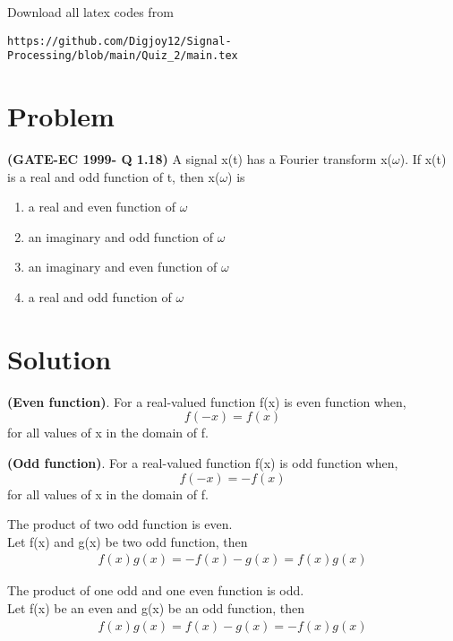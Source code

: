\documentclass[journal,12pt,twocolumn]{IEEEtran}
\begin{document}
%
Download all latex codes from 
%
\begin{lstlisting}
https://github.com/Digjoy12/Signal-Processing/blob/main/Quiz_2/main.tex
\end{lstlisting}
\section*{\textbf{Problem}}
\textbf{(GATE-EC 1999- Q 1.18)} A signal x(t) has a Fourier transform x($\omega$). If x(t) is a real and odd function of t, then x($\omega$) is
\begin{enumerate}[label=(\alph*)]
    \item a real and even function of $\omega$
    \item an imaginary and odd function of $\omega$
    \item an imaginary and even function of $\omega$
    \item a real and odd function of $\omega$
\end{enumerate}
\section*{\textbf{Solution}}
\begin{definition}{\textbf{(Even function)}}.
 For a real-valued function f(x) is even function when,
 \begin{equation}
     f(-x) = f(x)
 \end{equation}
 for all values of x in the domain of f.
\end{definition}
\begin{definition}{\textbf{(Odd function)}}.
 For a real-valued function f(x) is odd function when,
 \begin{equation}
     f(-x) = -f(x)
 \end{equation}
 for all values of x in the domain of f.
\end{definition}
\begin{corollary}\label{0.1}
The product of two odd function is even.\\
Let f(x) and g(x) be two odd function, then
\begin{align}
    f(x)g(x) = -f(x)-g(x) = f(x)g(x)
\end{align}
\end{corollary}
\begin{corollary}\label{0.2}
The product of one odd and one even function is odd.\\
Let f(x) be an even and g(x) be an odd function, then
\begin{align}
    f(x)g(x) = f(x)-g(x) = -f(x)g(x)
\end{align}
\end{corollary}
\end{document}
